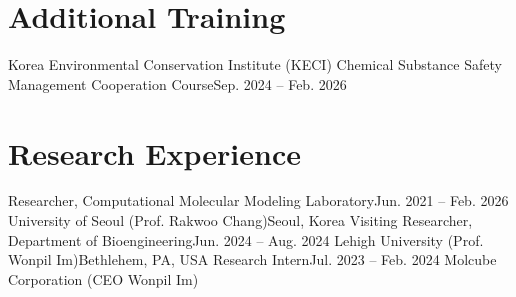 \iffullcv
\section{Additional Training}
  \resumeSubHeadingListStart
    \resumeSubheading
      {Korea Environmental Conservation Institute (KECI)}{}
      {Chemical Substance Safety Management Cooperation Course}{Sep. 2024 -- Feb. 2026}
      \resumeItemListStart
      \resumeItemListEnd
  \resumeSubHeadingListEnd
\fi

\section{Research Experience}
  \resumeSubHeadingListStart
    \resumeSubheading
      {Researcher, Computational Molecular Modeling Laboratory}{Jun. 2021 -- Feb. 2026}
      {University of Seoul (Prof. Rakwoo Chang)}{Seoul, Korea}
      \resumeItemListStart
      \resumeItemListEnd
    \resumeSubheading
      {Visiting Researcher, Department of Bioengineering}{Jun. 2024 -- Aug. 2024}
      {Lehigh University (Prof. Wonpil Im)}{Bethlehem, PA, USA}
      \iffullcv
      \resumeItemListStart
      \resumeItemListEnd
    \resumeSubheading
      {Research Intern}{Jul. 2023 -- Feb. 2024}
      {Molcube Corporation (CEO Wonpil Im)}{}
      \resumeItemListStart
      \resumeItemListEnd
      \fi
  \resumeSubHeadingListEnd

\iffullcv
